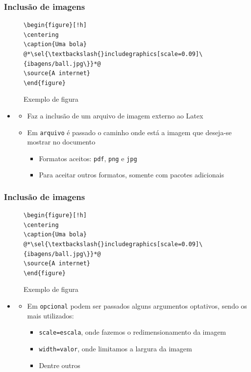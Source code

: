 \begin{frame}[fragile] \frametitle{Inclusão de imagens}
\vspace{-0.5cm}
\begin{figure}[!t]
\caption{Exemplo de figura}
\begin{lstlisting}
\begin{figure}[!h]
\centering
\caption{Uma bola}
@*\sel{\textbackslash{}includegraphics[scale=0.09]\{ibagens/ball.jpg\}}*@
\source{A internet}
\end{figure}
\end{lstlisting}
\ownsrc
\end{figure}

\begin{itemize}
	\item {}
	\begin{itemize}
		\item Faz a inclusão de um arquivo de imagem externo ao Latex
		\item Em \texttt{arquivo} é passado o caminho onde está a imagem que deseja-se mostrar no documento
		\begin{itemize}
			\item Formatos aceitos: \texttt{pdf}, \texttt{png} e \texttt{jpg}
			\item Para aceitar outros formatos, somente com pacotes adicionais
		\end{itemize}
	\end{itemize}
\end{itemize}
\end{frame}

\begin{frame}[fragile] \frametitle{Inclusão de imagens}
\vspace{-0.5cm}
\begin{figure}[!t]
\caption{Exemplo de figura}
\begin{lstlisting}
\begin{figure}[!h]
\centering
\caption{Uma bola}
@*\sel{\textbackslash{}includegraphics[scale=0.09]\{ibagens/ball.jpg\}}*@
\source{A internet}
\end{figure}
\end{lstlisting}
\ownsrc
\end{figure}

\begin{itemize}
	\item {}
	\begin{itemize}
		\item Em \texttt{opcional} podem ser passados alguns argumentos optativos, sendo os mais utilizados:
		\begin{itemize}
			\item \texttt{scale=escala}, onde fazemos o redimensionamento da imagem
			\item \texttt{width=valor}, onde limitamos a largura da imagem
			\item Dentre outros
		\end{itemize}
	\end{itemize}
\end{itemize}
\end{frame}

